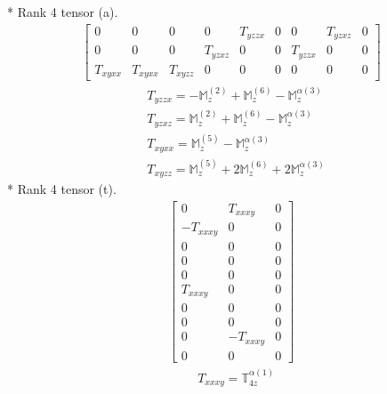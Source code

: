 \documentclass[fleqn,8pt,landscape]{jsarticle}
\begin{document}
* Rank 4 tensor (a).
\begin{align*}
\begin{bmatrix} 0 & 0 & 0 & 0 & T_{yzzx} & 0 & 0 & T_{yzxz} & 0 \\ 0 & 0 & 0 & T_{yzxz} & 0 & 0 & T_{yzzx} & 0 & 0 \\ T_{xyxx} & T_{xyxx} & T_{xyzz} & 0 & 0 & 0 & 0 & 0 & 0 \end{bmatrix}
\end{align*}
\begin{align*}
& T_{yzzx} = - \mathbb{M}_{z}^{(2)} + \mathbb{M}_{z}^{(6)} - \mathbb{M}_{z}^{\alpha(3)} \\
& T_{yzxz} = \mathbb{M}_{z}^{(2)} + \mathbb{M}_{z}^{(6)} - \mathbb{M}_{z}^{\alpha(3)} \\
& T_{xyxx} = \mathbb{M}_{z}^{(5)} - \mathbb{M}_{z}^{\alpha(3)} \\
& T_{xyzz} = \mathbb{M}_{z}^{(5)} + 2 \mathbb{M}_{z}^{(6)} + 2 \mathbb{M}_{z}^{\alpha(3)}
\end{align*}
* Rank 4 tensor (t).
\begin{align*}
\begin{bmatrix} 0 & T_{xxxy} & 0 \\ - T_{xxxy} & 0 & 0 \\ 0 & 0 & 0 \\ 0 & 0 & 0 \\ 0 & 0 & 0 \\ T_{xxxy} & 0 & 0 \\ 0 & 0 & 0 \\ 0 & 0 & 0 \\ 0 & - T_{xxxy} & 0 \\ 0 & 0 & 0 \end{bmatrix}
\end{align*}
\begin{align*}
& T_{xxxy} = \mathbb{T}_{4z}^{\alpha(1)}
\end{align*}
\end{document}
